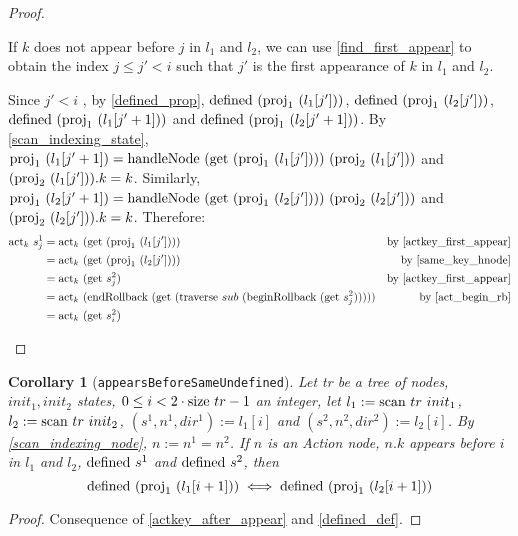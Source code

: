 \documentclass{article}
\newtheorem{corollary}[lemma]{Corollary}
\newcommand{\textfun}[1]{\textup{#1}}
\newcommand{\textcode}[1]{\texttt{#1}}
\newcommand{\traverse}[2]{\textfun{traverse}\ #1\ #2}
\newcommand{\scan}[2]{\textfun{scan}\ #1\ #2}
\newcommand{\hNode}[2]{\textfun{handleNode}\ #1\ #2}
\newcommand{\beginRb}[1]{\textfun{beginRollback}\ #1}
\newcommand{\enRb}[1]{\textfun{endRollback}\ #1}
\newcommand{\defined}[1]{\textfun{defined}\ #1}
\newcommand{\get}[1]{\textfun{get}\ #1}
\newcommand{\size}[1]{\textfun{size}\ #1}
\newcommand{\fst}[1]{\textfun{proj}_1\ #1}
\newcommand{\snd}[1]{\textfun{proj}_2\ #1}
\newcommand{\actkey}[2]{\textfun{act}_{#1}\ #2}
\begin{document}
\begin{proof}
\begin{itemize}
        If $k$ does not appear before $j$ in $l_1$ and $l_2$, we can use \cref{find_first_appear} to obtain the index $j \leq j' < i$ such that $j'$ is the
        first appearance of $k$ in $l_1$ and $l_2$. 

        Since $j' < i$ , by \cref{defined_prop}, $\defined{(\fst{(l_1[j'])})}$, $\defined{(\fst{(l_2[j'])})}$, $\defined{(\fst{(l_1[j' + 1])})}$ and  $\defined{(\fst{(l_2[j' + 1])})}$.
        By \cref{scan_indexing_state}, $\fst{(l_1[j' + 1])} = \hNode{(\get{(\fst{(l_1[j'])})})}{(\snd{(l_1[j'])})}$ and $(\snd{(l_1[j'])}).k = k$.
        Similarly, $\fst{(l_2[j' + 1])} = \hNode{(\get{(\fst{(l_2[j'])})})}{(\snd{(l_2[j'])})}$ and $(\snd{(l_2[j'])}).k = k$.
        Therefore:
        \begin{align*}
            \actkey{k}{s^1_{j}} &= \actkey{k}{(\get{(\fst{(l_1[j'])})})} &\text{by \cref{actkey_first_appear}} \\
            &= \actkey{k}{(\get{(\fst{(l_2[j'])})})} &\text{by \cref{same_key_hnode}} \\
            &= \actkey{k}{(\get{s^2_{j}})} &\text{by \cref{actkey_first_appear}} \\
            &= \actkey{k}{(\enRb{(\get{(\traverse{sub}{(\beginRb{(\get{s^2_j})})})})})} &\text{by \cref{act_begin_rb}} \\
            &= \actkey{k}{(\get{s^2_i})}
        \end{align*}
        
    \end{itemize} 

\end{proof}

\begin{corollary}[\textcode{appearsBeforeSameUndefined}]
    \label{same_defined_appear}
    Let tr be a tree of nodes, $init_1, init_2$ states, $0 \leq i < 2\cdot \size{tr} - 1$ an integer, let $l_1 := \scan{tr}{init_1}$, $l_2 := \scan{tr}{init_2}$, $(s^1, n^1, dir^1) := l_1[i]$ and $(s^2, n^2, dir^2) := l_2[i]$. 
    By \cref{scan_indexing_node}, $n := n^1 = n^2$. If $n$ is an Action node, $n.k$ appears before $i$ in $l_1$ and $l_2$, $\defined{s^1}$ and $\defined{s^2}$, then 
    \[\defined{(\fst{(l_1[i + 1])})} \iff \defined{(\fst{(l_2[i + 1])})}\]
\end{corollary}

\begin{proof}
    Consequence of \cref{actkey_after_appear} and \cref{defined_def}.
\end{proof}
\end{document}
